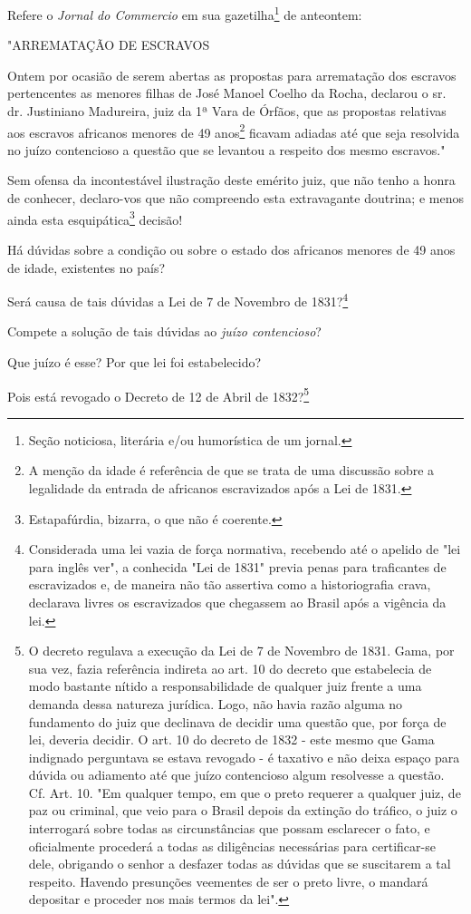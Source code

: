 Refere o \emph{Jornal do Commercio} em sua gazetilha\footnote{Seção
  noticiosa, literária e/ou humorística de um jornal.} de anteontem:

"ARREMATAÇÃO DE ESCRAVOS

Ontem por ocasião de serem abertas as propostas para arrematação dos
escravos pertencentes as menores filhas de José Manoel Coelho da Rocha,
declarou o sr. dr. Justiniano Madureira, juiz da 1ª Vara de Órfãos, que
as propostas relativas aos escravos africanos menores de 49
anos\footnote{A menção da idade é referência de que se trata de uma
  discussão sobre a legalidade da entrada de africanos escravizados após
  a Lei de 1831.} ficavam adiadas até que seja resolvida no juízo
contencioso a questão que se levantou a respeito dos mesmo escravos."

Sem ofensa da incontestável ilustração deste emérito juiz, que não tenho
a honra de conhecer, declaro-vos que não compreendo esta extravagante
doutrina; e menos ainda esta esquipática\footnote{Estapafúrdia,
  bizarra, o que não é coerente.} decisão!

Há dúvidas sobre a condição ou sobre o estado dos africanos menores de
49 anos de idade, existentes no país?

Será causa de tais dúvidas a Lei de 7 de Novembro de 1831?\footnote{
  Considerada uma lei vazia de força normativa, recebendo até o apelido
  de "lei para inglês ver", a conhecida "Lei de 1831" previa penas para
  traficantes de escravizados e, de maneira não tão assertiva como a
  historiografia crava, declarava livres os escravizados que chegassem
  ao Brasil após a vigência da lei.}

Compete a solução de tais dúvidas ao \emph{juízo contencioso}?

Que juízo é esse? Por que lei foi estabelecido?

Pois está revogado o Decreto de 12 de Abril de 1832?\footnote{O
  decreto regulava a execução da Lei de 7 de Novembro de 1831. Gama, por
  sua vez, fazia referência indireta ao art. 10 do decreto que
  estabelecia de modo bastante nítido a responsabilidade de qualquer
  juiz frente a uma demanda dessa natureza jurídica. Logo, não havia
  razão alguma no fundamento do juiz que declinava de decidir uma
  questão que, por força de lei, deveria decidir. O art. 10 do decreto
  de 1832 - este mesmo que Gama indignado perguntava se estava revogado
  - é taxativo e não deixa espaço para dúvida ou adiamento até que juízo
  contencioso algum resolvesse a questão. Cf. Art. 10. "Em qualquer
  tempo, em que o preto requerer a qualquer juiz, de paz ou criminal,
  que veio para o Brasil depois da extinção do tráfico, o juiz o
  interrogará sobre todas as circunstâncias que possam esclarecer o
  fato, e oficialmente procederá a todas as diligências necessárias para
  certificar-se dele, obrigando o senhor a desfazer todas as dúvidas que
  se suscitarem a tal respeito. Havendo presunções veementes de ser o
  preto livre, o mandará depositar e proceder nos mais termos da lei".}

